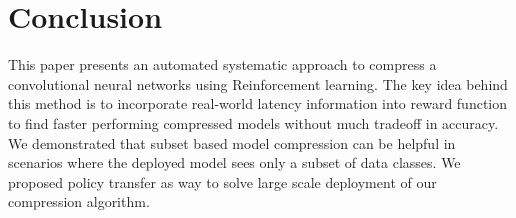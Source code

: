 \documentclass[../main]{subfiles}
\begin{document}
\section{Conclusion}
    \label{sec:conclude}
    This paper presents an automated systematic approach to compress a convolutional neural networks using Reinforcement learning.
    The key idea behind this method is to incorporate real-world latency information into reward function to find faster performing compressed models without much tradeoff in accuracy. We demonstrated that subset based model compression can be helpful in scenarios where the deployed model sees only a subset of data classes. We proposed policy transfer as way to solve large scale deployment of our compression algorithm.
\end{document}
